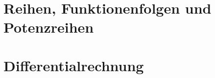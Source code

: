 \documentclass[a4paper,leqno]{article}
\begin{document}
\vspace{2\baselineskip}



\vspace{2\baselineskip}



\pagebreak

\section{Reihen, Funktionenfolgen und Potenzreihen}

\vspace{1\baselineskip}



\vspace{2\baselineskip}



\vspace{2\baselineskip}



\pagebreak



\vspace{2\baselineskip}



\pagebreak

\section{Differentialrechnung}

\vspace{1\baselineskip}



\pagebreak



\vspace{2\baselineskip}
\end{document}
